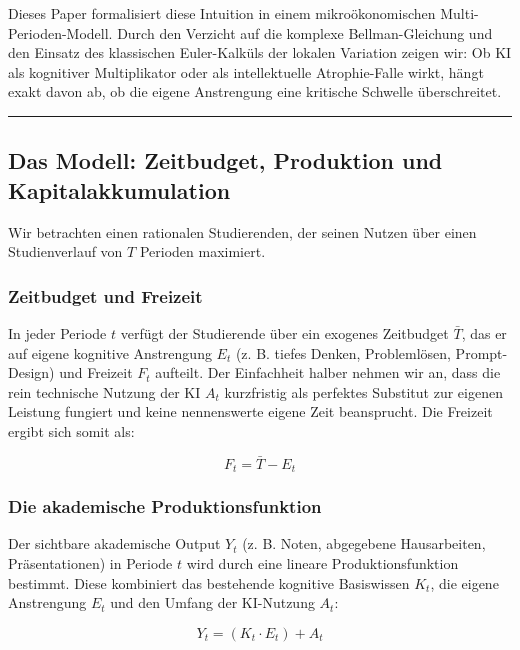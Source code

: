 \documentclass[
  ngerman,
  letterpaper,
  DIV=11]{scrartcl}
\begin{document}
Dieses Paper formalisiert diese Intuition in einem mikroökonomischen
Multi-Perioden-Modell. Durch den Verzicht auf die komplexe
Bellman-Gleichung und den Einsatz des klassischen Euler-Kalküls der
lokalen Variation zeigen wir: Ob KI als kognitiver Multiplikator oder
als intellektuelle Atrophie-Falle wirkt, hängt exakt davon ab, ob die
eigene Anstrengung eine kritische Schwelle überschreitet.

\begin{center}\rule{0.5\linewidth}{0.5pt}\end{center}

\subsection{Das Modell: Zeitbudget, Produktion und
Kapitalakkumulation}\label{das-modell-zeitbudget-produktion-und-kapitalakkumulation}

Wir betrachten einen rationalen Studierenden, der seinen Nutzen über
einen Studienverlauf von \(T\) Perioden maximiert.

\subsubsection{Zeitbudget und Freizeit}\label{zeitbudget-und-freizeit}

In jeder Periode \(t\) verfügt der Studierende über ein exogenes
Zeitbudget \(\bar{T}\), das er auf eigene kognitive Anstrengung \(E_t\)
(z. B. tiefes Denken, Problemlösen, Prompt-Design) und Freizeit \(F_t\)
aufteilt. Der Einfachheit halber nehmen wir an, dass die rein technische
Nutzung der KI \(A_t\) kurzfristig als perfektes Substitut zur eigenen
Leistung fungiert und keine nennenswerte eigene Zeit beansprucht. Die
Freizeit ergibt sich somit als:

\[F_t = \bar{T} - E_t\]

\subsubsection{Die akademische
Produktionsfunktion}\label{die-akademische-produktionsfunktion}

Der sichtbare akademische Output \(Y_t\) (z. B. Noten, abgegebene
Hausarbeiten, Präsentationen) in Periode \(t\) wird durch eine lineare
Produktionsfunktion bestimmt. Diese kombiniert das bestehende kognitive
Basiswissen \(K_t\), die eigene Anstrengung \(E_t\) und den Umfang der
KI-Nutzung \(A_t\):

\[Y_t = (K_t \cdot E_t) + A_t\]
\end{document}
